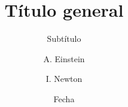 \title[Título secundario]
{Título general}
\subtitle{Subtítulo}

\author[Einstein, Newton]
{A. Einstein \and I. Newton}


\date[Opcional]
{Fecha}

